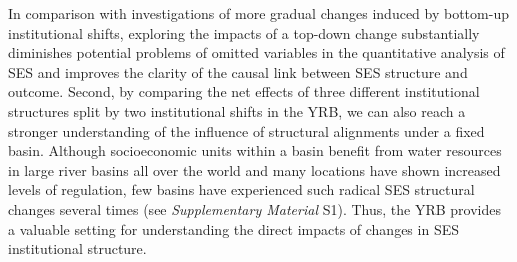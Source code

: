 \documentclass{nsr}
\begin{document}
In comparison with investigations of more gradual changes induced by bottom-up institutional shifts, exploring the impacts of a top-down change substantially diminishes potential problems of omitted variables in the quantitative analysis of SES and improves the clarity of the causal link between SES structure and outcome.
Second, by comparing the net effects of three different institutional structures split by two institutional shifts in the YRB, we can also reach a stronger understanding of the influence of structural alignments under a fixed basin. Although socioeconomic units within a basin benefit from water resources in large river basins all over the world and many locations have shown increased levels of regulation, few basins have experienced such radical SES structural changes several times (see \textit{Supplementary Material} S1). Thus, the YRB provides a valuable setting for understanding the direct impacts of changes in SES institutional structure.
\end{document}
